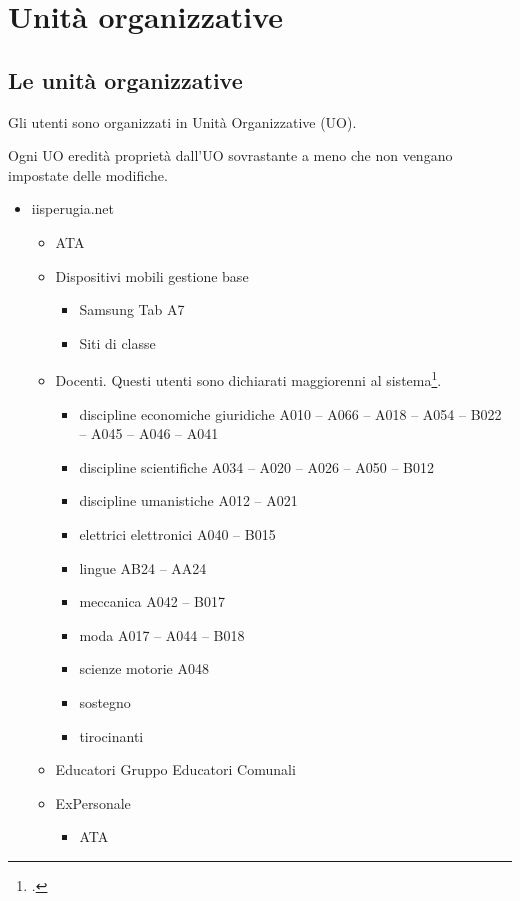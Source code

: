 \chapter{Unità organizzative}
\section{Le unità organizzative}
Gli utenti sono organizzati in Unità Organizzative (UO). 

Ogni UO eredità proprietà dall'UO sovrastante a meno che non vengano impostate delle modifiche.
\begin{itemize}
	\item iisperugia.net
	\begin{itemize}
		\item ATA
		\item Dispositivi mobili gestione base
		\begin{itemize}
			\item Samsung Tab A7
			\item Siti di classe
		\end{itemize}
	\item Docenti. Questi utenti sono dichiarati maggiorenni al sistema\footcite{Google2021b}.
	\begin{itemize}
		\item discipline economiche giuridiche A010 – A066 – A018 – A054 – B022 – A045 – A046 – A041
		\item discipline scientifiche
		A034 – A020 – A026 – A050 – B012
		\item discipline umanistiche
		A012 – A021
		\item elettrici elettronici
		A040 – B015
		\item lingue
		AB24 – AA24
		\item meccanica
		A042 – B017
		\item moda
		A017 – A044 – B018
		\item scienze motorie
		A048 
		\item sostegno
		\item tirocinanti
		\end{itemize}
\item  Educatori
Gruppo Educatori Comunali
\item ExPersonale
\begin{itemize}
	\item ATA

\end{itemize}
\end{itemize}
\end{itemize}
